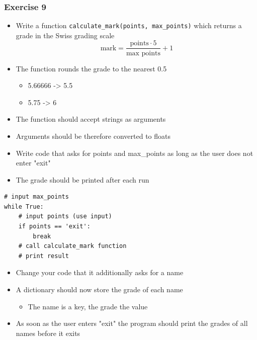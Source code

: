 \documentclass[10pt, a4paper]{beamer} %
\begin{document}
{\begin{frame}[c, fragile]
\end{frame}

\begin{frame}\frametitle{Exercise 9}
    
\begin{itemize}
    \item Write a function \texttt{calculate\_mark(points, max\_points)} which returns a grade in the Swiss grading scale
    \[ \text{mark} = \frac{\text{points}\cdot 5}{\text{max points}} + 1 \]
    \item The function rounds the grade to the nearest 0.5
    \begin{itemize}
        \item 5.66666 -> 5.5
        \item 5.75 -> 6
    \end{itemize}
    \item The function should accept strings as arguments
    \item Arguments should be therefore converted to floats
\end{itemize}

\framebreak

\begin{itemize}
    \item Write code that asks for points and max\_points as long as the user does not enter "exit"
    \item The grade should be printed after each run
\end{itemize}

{
\mdseries
{}
\begin{lstlisting}
# input max_points
while True:
    # input points (use input)
    if points == 'exit':
        break
    # call calculate_mark function
    # print result
\end{lstlisting}
}
\framebreak

\begin{itemize}
    \item Change your code that it additionally asks for a name
    \item A dictionary should now store the grade of each name
    \begin{itemize}
        \item The name is a key, the grade the value
    \end{itemize}
    \item As soon as the user enters "exit" the program should print the grades of all names before it exits
\end{itemize}


\end{frame}}
\end{document}
